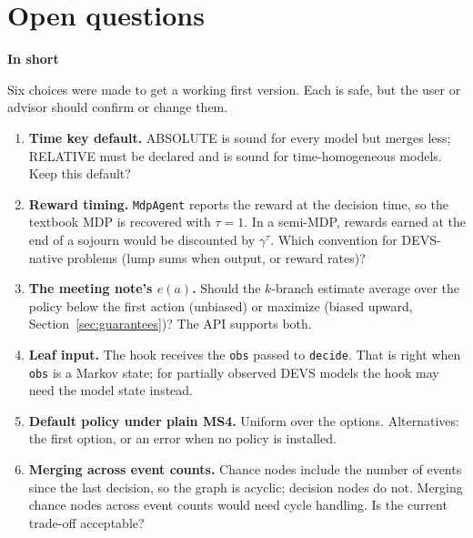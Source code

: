 \documentclass[11pt]{article}
\newcommand{\code}[1]{\texttt{#1}}
\newcommand{\shadedbox}[3]{\par\smallskip\noindent\colorbox{#1}{\parbox{\dimexpr\linewidth-2\fboxsep}{\textbf{#2}\par #3}}\par\smallskip}
\newcommand{\takeaway}[1]{\shadedbox{okbg}{In short}{#1}}
\theoremstyle{plain}
\begin{document}
\section{Open questions}\label{sec:questions}

\takeaway{Six choices were made to get a working first version. Each is safe, but the user or advisor should confirm
or change them.}

\begin{enumerate}
\item \textbf{Time key default.} ABSOLUTE is sound for every model but merges less; RELATIVE must be declared and is
  sound for time-homogeneous models. Keep this default?
\item \textbf{Reward timing.} \code{MdpAgent} reports the reward at the decision time, so the textbook MDP is recovered
  with $\tau=1$. In a semi-MDP, rewards earned at the end of a sojourn would be discounted by $\gamma^{\tau}$. Which
  convention for DEVS-native problems (lump sums when output, or reward rates)?
\item \textbf{The meeting note's $e(a)$.} Should the $k$-branch estimate average over the policy below the first action
  (unbiased) or maximize (biased upward, Section~\ref{sec:guarantees})? The API supports both.
\item \textbf{Leaf input.} The hook receives the \code{obs} passed to \code{decide}. That is right when \code{obs} is a
  Markov state; for partially observed DEVS models the hook may need the model state instead.
\item \textbf{Default policy under plain MS4.} Uniform over the options. Alternatives: the first option, or an error
  when no policy is installed.
\item \textbf{Merging across event counts.} Chance nodes include the number of events since the last decision, so the
  graph is acyclic; decision nodes do not. Merging chance nodes across event counts would need cycle handling. Is the
  current trade-off acceptable?
\end{enumerate}

\appendix
\end{document}
